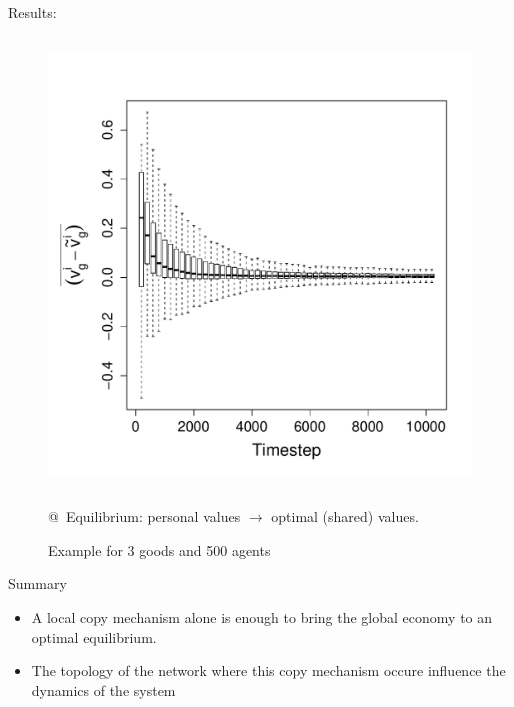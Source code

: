 \documentclass[12pt, handout=show,notes=show]{beamer}
\begin{document}
\begin{frame}{Results: }
	\begin{figure}
	    \caption{Example for 3 goods and 500 agents}
	    \begin{columns}
		\includegraphics[height=\textwidth]{images/ClearingPriceDistanceEvolutionForTrade-G3N500.pdf}\\
	    \end{columns}
		@~Equilibrium: personal values  $\rightarrow$ optimal (shared) values.
	\end{figure}
	
\end{frame}

\begin{frame}{Summary}
\begin{itemize}
	\item A local copy mechanism alone is enough to bring the global economy to an optimal equilibrium.
		\vfill
	\item The topology of the network where this copy mechanism occure influence the dynamics of the system
		\vfill
\end{itemize}

\end{frame}
\end{document}
